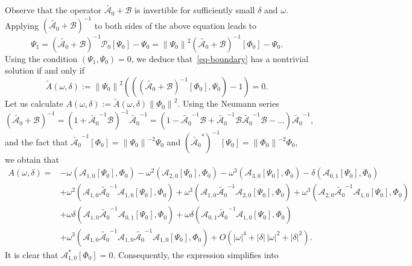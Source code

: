 \documentclass[11pt]{article}
\numberwithin{equation}{section}
\newcommand\1{{\ensuremath {\mathds 1} }}
\def\be{\begin{equation}} \def\ee{\end{equation}}
\begin{document}
Observe that the operator $\tilde{\mathcal{A}_0} + \mathcal{B}$ is invertible for sufficiently small $\delta$ and $\omega$. Applying $(\tilde{\mathcal{A}_0} + \mathcal{B})^{-1}$ to both sides of the above equation leads to
\be  \label{eq-resonance-2}
\Psi_1= (\tilde{\mathcal{A}_0} + \mathcal{B})^{-1} \mathcal{P}_0 [\Psi_0] - \Psi_0
= \left\| \Psi_0 \right\|^2 (\tilde{\mathcal{A}_0} + \mathcal{B})^{-1}[\Phi_0] - \Psi_0.
\ee
Using the condition $(\Psi_1, \Psi_0)=0$, we deduce that~\eqref{eq-boundary} has a nontrivial solution if and only if
\be  \label{eq-algebraic}
\widetilde{A}(\omega, \delta) := \left\| \Psi_0 \right\|^2 \left( \left((\tilde{\mathcal{A}_0} + \mathcal{B})^{-1} [\Phi_0], \Psi_0\right) - 1 \right)=0.
\ee
Let us calculate $A(\omega, \delta) := \widetilde{A}(\omega, \delta) \left\| \Phi_0 \right\|^2$.  Using the Neumann series
$$
(\tilde{\mathcal{A}_0} + \mathcal{B})^{-1} 
= \left(1+ \tilde{\mathcal{A}_0}^{-1} \mathcal{B}\right)^{-1} \tilde{\mathcal{A}_0}^{-1}
= \left( 1- \tilde{\mathcal{A}_0}^{-1}\mathcal{B} + \tilde{\mathcal{A}_0}^{-1}\mathcal{B}\tilde{\mathcal{A}_0}^{-1}\mathcal{B}- ...\right)\tilde{\mathcal{A}_0}^{-1}, 
$$
and the fact that $\tilde{\mathcal{A}_0}^{-1}[\Phi_0] = \left\| \Psi_0 \right\|^{-2} \Psi_0$ and $(\tilde{\mathcal{A}_0}^*)^{-1}[\Psi_0] = \left\| \Phi_0 \right\|^{-2} \Phi_0$, we obtain that
\begin{align*}
A(\omega, \delta)
=& -\omega \left( \mathcal{A}_{1,0}[\Psi_0], \Phi_0\right)
-\omega^2 \left( \mathcal{A}_{2,0}[\Psi_0], \Phi_0\right)
-\omega^3 \left( \mathcal{A}_{3,0}[\Psi_0], \Phi_0\right)  -\delta \left( \mathcal{A}_{0,1}[\Psi_0], \Phi_0\right)\\
& + \omega^2 \left( \mathcal{A}_{1,0}\tilde{\mathcal{A}_0}^{-1}\mathcal{A}_{1,0}[\Psi_0], \Phi_0\right) 
+ \omega^3 \left( \mathcal{A}_{1,0}\tilde{\mathcal{A}_0}^{-1}\mathcal{A}_{2,0}[\Psi_0], \Phi_0\right) 
+\omega^3 \left( \mathcal{A}_{2,0}\tilde{\mathcal{A}_0}^{-1}\mathcal{A}_{1,0}[\Psi_0], \Phi_0\right) \\
& + \omega \delta \left( \mathcal{A}_{1,0}\tilde{\mathcal{A}_0}^{-1}\mathcal{A}_{0,1}[\Psi_0], \Phi_0\right)  
 + \omega \delta \left( \mathcal{A}_{0,1}\tilde{\mathcal{A}_0}^{-1}\mathcal{A}_{1,0}[\Psi_0], \Phi_0\right) \\
& + \omega^3 \left( \mathcal{A}_{1,0}\tilde{\mathcal{A}_0}^{-1}\mathcal{A}_{1,0}\tilde{\mathcal{A}_0}^{-1}\mathcal{A}_{1,0}[\Psi_0], \Phi_0\right) + O( | \omega |^4 + | \delta | \, |\omega|^2  + | \delta |^2).
\end{align*}
It is clear that $\mathcal{A}_{1,0}^*[\Phi_0]=0$. Consequently, the expression simplifies into
\end{document}
